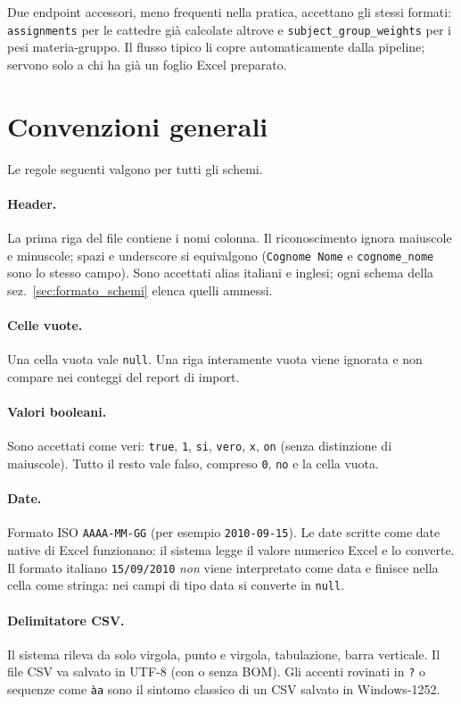 Due endpoint accessori, meno frequenti nella pratica, accettano
gli stessi formati: \texttt{assignments} per le cattedre gi\`a
calcolate altrove e \texttt{subject\_group\_weights} per i pesi
materia-gruppo. Il flusso tipico li copre automaticamente dalla
pipeline; servono solo a chi ha gi\`a un foglio Excel preparato.

\section{Convenzioni generali}

Le regole seguenti valgono per tutti gli schemi.

\paragraph{Header.} La prima riga del file contiene i nomi
colonna. Il riconoscimento ignora maiuscole e minuscole; spazi e
underscore si equivalgono (\texttt{Cognome Nome} e
\texttt{cognome\_nome} sono lo stesso campo). Sono accettati alias
italiani e inglesi; ogni schema della sez.~\ref{sec:formato_schemi}
elenca quelli ammessi.

\paragraph{Celle vuote.} Una cella vuota vale \texttt{null}. Una
riga interamente vuota viene ignorata e non compare nei conteggi
del report di import.

\paragraph{Valori booleani.} Sono accettati come veri:
\texttt{true}, \texttt{1}, \texttt{si}, \texttt{vero}, \texttt{x},
\texttt{on} (senza distinzione di maiuscole). Tutto il resto vale
falso, compreso \texttt{0}, \texttt{no} e la cella vuota.

\paragraph{Date.} Formato ISO \texttt{AAAA-MM-GG} (per
esempio \texttt{2010-09-15}). Le date scritte come date native di
Excel funzionano: il sistema legge il valore numerico Excel e lo
converte. Il formato italiano \texttt{15/09/2010} \emph{non} viene
interpretato come data e finisce nella cella come stringa: nei
campi di tipo data si converte in \texttt{null}.

\paragraph{Delimitatore CSV.} Il sistema rileva da solo virgola,
punto e virgola, tabulazione, barra verticale. Il file CSV va
salvato in UTF-8 (con o senza BOM). Gli accenti rovinati in
\texttt{?} o sequenze come \texttt{\`a}\texttt{a} sono il sintomo
classico di un CSV salvato in Windows-1252.

